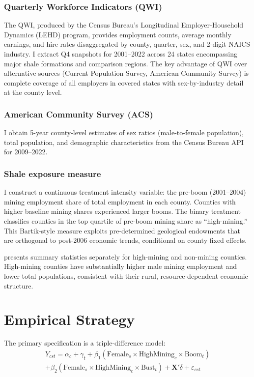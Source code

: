 \documentclass[12pt]{article}
\begin{document}
\subsubsection*{Quarterly Workforce Indicators (QWI)} The QWI, produced by the Census Bureau's Longitudinal Employer-Household Dynamics (LEHD) program, provides employment counts, average monthly earnings, and hire rates disaggregated by county, quarter, sex, and 2-digit NAICS industry. I extract Q4 snapshots for 2001--2022 across 24 states encompassing major shale formations and comparison regions. The key advantage of QWI over alternative sources (Current Population Survey, American Community Survey) is complete coverage of all employers in covered states with sex-by-industry detail at the county level.

\subsubsection*{American Community Survey (ACS)} I obtain 5-year county-level estimates of sex ratios (male-to-female population), total population, and demographic characteristics from the Census Bureau API for 2009--2022.

\subsubsection*{Shale exposure measure} I construct a continuous treatment intensity variable: the pre-boom (2001--2004) mining employment share of total employment in each county. Counties with higher baseline mining shares experienced larger booms. The binary treatment classifies counties in the top quartile of pre-boom mining share as ``high-mining.'' This Bartik-style measure exploits pre-determined geological endowments that are orthogonal to post-2006 economic trends, conditional on county fixed effects.

 presents summary statistics separately for high-mining and non-mining counties. High-mining counties have substantially higher male mining employment and lower total populations, consistent with their rural, resource-dependent economic structure.

\section{Empirical Strategy}

The primary specification is a triple-difference model:
\begin{multline}
\label{eq:triple_diff}
Y_{cst} = \alpha_c + \gamma_t + \beta_1 (\text{Female}_s \times \text{HighMining}_c \times \text{Boom}_t) \\
+ \beta_2 (\text{Female}_s \times \text{HighMining}_c \times \text{Bust}_t) + \mathbf{X}'\delta + \varepsilon_{cst}
\end{multline}
\end{document}
